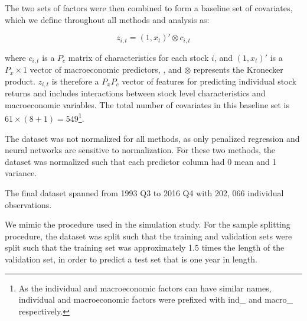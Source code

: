 \documentclass{article}
\begin{document}
The two sets of factors were then combined to form a baseline set of covariates, which we define throughout all methods and analysis as:

\begin{equation}
z_{i,t} = (1, x_t)' \otimes c_{i, t}
\end{equation}

where $c_{i,t}$ is a $P_c$ matrix of characteristics for each stock $i$, and $(1, x_t)'$ is a $P_x \times 1$ vector of macroeconomic predictors, , and $\otimes$ represents the Kronecker product. $z_{i,t}$ is therefore a $P_x P_c$ vector of features for predicting individual stock returns and includes interactions between stock level characteristics and macroeconomic variables. The total number of covariates in this baseline set is $61 \times (8 + 1) = 549$\footnote{As the individual and macroeconomic factors can have similar names, individual and macroeconomic factors were prefixed with ind\_ and macro\_ respectively.}.


The dataset was not normalized for all methods, as only penalized regression and neural networks are sensitive to normalization. For these two methods, the dataset was normalized such that each predictor column had 0 mean and 1 variance.

The final dataset spanned from 1993 Q3 to 2016 Q4 with 202, 066 individual observations.

We mimic the procedure used in the simulation study. For the sample splitting procedure, the dataset was split such that the training and validation sets were split such that the training set was approximately 1.5 times the length of the validation set, in order to predict a test set that is one year in length.
\end{document}

